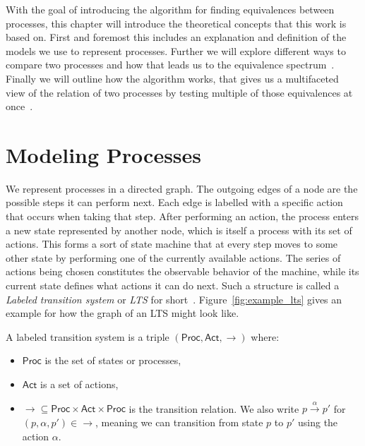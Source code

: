 With the goal of introducing the algorithm for finding equivalences between
processes,
this chapter will introduce the theoretical concepts that this work is based on.
First and foremost this includes an explanation and definition
of the models we use to represent processes.
Further we will explore different ways to compare two processes and how that
leads us to the equivalence spectrum~\cite{glabbeek1990spectrum}.
Finally we will outline how the algorithm works,
that gives us a multifaceted view of the relation of two processes by testing
multiple of those equivalences at once~\cite{bisping2023process}.


\section{Modeling Processes}

We represent processes in a directed graph.
The outgoing edges of a node are the possible steps it can perform next.
Each edge is labelled with a specific action that occurs when taking that step.
After performing an action,
the process enters a new state represented by another node,
which is itself a process with its set of actions.
This forms a sort of state machine that at every step
moves to some other state by performing one of the currently available actions.
The series of actions being chosen
constitutes the observable behavior of the machine,
while its current state defines what actions it can do next.
Such a structure is called a \emph{Labeled transition system}
or \emph{LTS} for short~\cite{reactive_systems}.
Figure~\ref{fig:example_lts} gives an example for how the graph of an LTS might
look like.

\begin{definition}
    A labeled transition system is a triple
    $(\mathsf{Proc}, \mathsf{Act}, {\rightarrow})$
    where:

    \begin{itemize}
        \item $\mathsf{Proc}$ is the set of states or processes,
        \item $\mathsf{Act}$ is a set of actions,
        \item ${\rightarrow} \subseteq \mathsf{Proc} \times \mathsf{Act} \times \mathsf{Proc}$
            is the transition relation.
            We also write
            $p \xrightarrow{\alpha} p'$ for $(p, \alpha, p') \in {\rightarrow}$,
            meaning we can transition from state $p$ to $p'$
            using the action $\alpha$.
    \end{itemize}
\end{definition}

